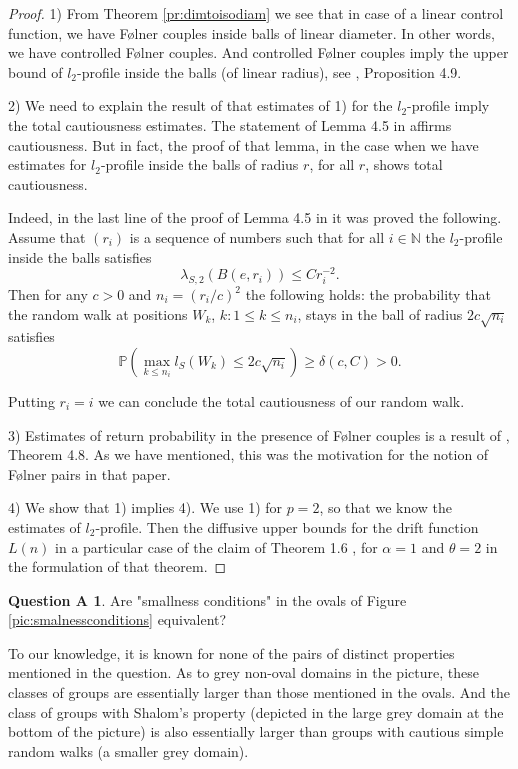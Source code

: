 \documentclass{amsart}
\numberwithin{figure}{section}
\theoremstyle{plain}
\theoremstyle{definition}
\newtheorem*{question*}{Question A}
\begin{document}
\begin{proof} 

1)  From Theorem 
\ref{pr:dimtoisodiam} we see that in case of a linear control function, we have F{\o}lner couples inside balls of linear diameter. In other words, we have controlled F{\o}lner couples. And
controlled  F{\o}lner couples imply the upper bound of $l_2$-profile inside the balls (of linear radius),
see \cite{tesseracontrolled}, Proposition 4.9. 


2) We need to explain the result of \cite{erschlerzheng}
that estimates of 1) for  the $l_2$-profile imply the total cautiousness estimates.
The statement of  Lemma 4.5 in \cite{erschlerzheng} affirms cautiousness.  But in fact, the proof of that lemma, in the case when we have estimates for $l_2$-profile inside the balls of radius $r$, for all $r$, shows total cautiousness.

 Indeed, in the last line of the proof
of Lemma 4.5 in \cite{erschlerzheng} it was proved the following.
Assume that $(r_i)$ is a sequence of numbers such that for all $i\in \mathbb{N}$ the $l_2$-profile inside the balls  satisfies 
$$
\lambda_{S,2}(B(e, r_i)) \le Cr_i^{-2}.
$$
Then for any $c>0$
and $n_i =  (r_i/c)^2$
the following holds: the probability that the random walk at positions $W_k$, $k: 1 \le k \le n_i$,  stays in the ball of radius $2c\sqrt{n_i}$
satisfies
\[
\mathbb{P} \left( \max_{k \leq n_i} l_S (W_k) \leq 2c\sqrt{n_i} \right) 
\geq \delta(c, C) > 0.
\]
 
 Putting $r_i=i$ we can conclude the total cautiousness of our random walk.

3) Estimates of return probability in the presence of F{\o}lner couples is a result
of \cite{coulhongrigoryanpittet}, Theorem 4.8.
As we have mentioned, this was the motivation for the notion 
of F{\o}lner pairs in that paper.

4) We show that 1) implies 4). We use 1) for $p=2$, so that we know the estimates of $l_2$-profile.
Then the diffusive upper bounds for the drift function $L(n)$ in a particular case of the claim of Theorem 1.6 \cite{pereszheng}, for
$\alpha=1$ and $\theta=2$ in the formulation of that theorem.


\end{proof}


\begin{question*}
Are  "smallness conditions" in the ovals of Figure \ref{pic:smalnessconditions} equivalent? 
\end{question*}
To our knowledge, it is known for none of the pairs of distinct  properties mentioned in the question. As to  grey non-oval domains in the picture, these classes of groups are essentially larger than those mentioned in the ovals. And the class of groups with  Shalom's property
(depicted in the large grey domain at the bottom of the picture) is also essentially larger than groups with cautious simple random walks
(a smaller grey domain).
\end{document}
